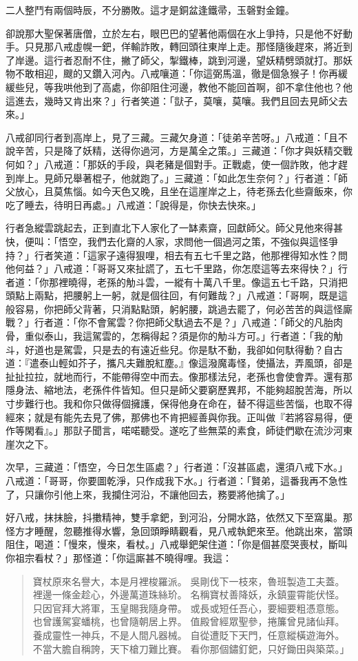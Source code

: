 二人整鬥有兩個時辰，不分勝敗。這才是銅盆逢鐵帚，玉磬對金鐘。

卻說那大聖保著唐僧，立於左右，眼巴巴的望著他兩個在水上爭持，只是他不好動手。只見那八戒虛幌一鈀，佯輸詐敗，轉回頭往東岸上走。那怪隨後趕來，將近到了岸邊。這行者忍耐不住，撇了師父，掣鐵棒，跳到河邊，望妖精劈頭就打。那妖物不敢相迎，颼的又鑽入河內。八戒嚷道：「你這弼馬溫，徹是個急猴子！你再緩緩些兒，等我哄他到了高處，你卻阻住河邊，教他不能回首啊，卻不拿住他也？他這進去，幾時又肯出來？」行者笑道：「獃子，莫嚷，莫嚷。我們且回去見師父去來。」

八戒卻同行者到高岸上，見了三藏。三藏欠身道：「徒弟辛苦呀。」八戒道：「且不說辛苦，只是降了妖精，送得你過河，方是萬全之策。」三藏道：「你才與妖精交戰何如？」八戒道：「那妖的手段，與老豬是個對手。正戰處，使一個詐敗，他才趕到岸上。見師兄舉著棍子，他就跑了。」三藏道：「如此怎生奈何？」行者道：「師父放心，且莫焦惱。如今天色又晚，且坐在這崖岸之上，待老孫去化些齋飯來，你吃了睡去，待明日再處。」八戒道：「說得是，你快去快來。」

行者急縱雲跳起去，正到直北下人家化了一缽素齋，回獻師父。師父見他來得甚快，便叫：「悟空，我們去化齋的人家，求問他一個過河之策，不強似與這怪爭持？」行者笑道：「這家子遠得狠哩，相去有五七千里之路，他那裡得知水性？問他何益？」八戒道：「哥哥又來扯謊了，五七千里路，你怎麼這等去來得快？」行者道：「你那裡曉得，老孫的觔斗雲，一縱有十萬八千里。像這五七千路，只消把頭點上兩點，把腰躬上一躬，就是個往回，有何難哉？」八戒道：「哥啊，既是這般容易，你把師父背著，只消點點頭，躬躬腰，跳過去罷了，何必苦苦的與這怪廝戰？」行者道：「你不會駕雲？你把師父馱過去不是？」八戒道：「師父的凡胎肉骨，重似泰山，我這駕雲的，怎稱得起？須是你的觔斗方可。」行者道：「我的觔斗，好道也是駕雲，只是去的有遠近些兒。你是馱不動，我卻如何馱得動？自古道：『遣泰山輕如芥子，攜凡夫難脫紅塵。』像這潑魔毒怪，使攝法，弄風頭，卻是扯扯拉拉，就地而行，不能帶得空中而去。像那樣法兒，老孫也會使會弄。還有那隱身法、縮地法，老孫件件皆知。但只是師父要窮歷異邦，不能夠超脫苦海，所以寸步難行也。我和你只做得個擁護，保得他身在命在，替不得這些苦惱，也取不得經來；就是有能先去見了佛，那佛也不肯把經善與你我。正叫做『若將容易得，便作等閑看』。」那獃子聞言，喏喏聽受。遂吃了些無菜的素食，師徒們歇在流沙河東崖次之下。

次早，三藏道：「悟空，今日怎生區處？」行者道：「沒甚區處，還須八戒下水。」八戒道：「哥哥，你要圖乾淨，只作成我下水。」行者道：「賢弟，這番我再不急性了，只讓你引他上來，我攔住河沿，不讓他回去，務要將他擒了。」

好八戒，抹抹臉，抖擻精神，雙手拿鈀，到河沿，分開水路，依然又下至窩巢。那怪方才睡醒，忽聽推得水響，急回頭睜睛觀看，見八戒執鈀來至。他跳出來，當頭阻住，喝道：「慢來，慢來，看杖。」八戒舉鈀架住道：「你是個甚麼哭喪杖，斷叫你祖宗看杖？」那怪道：「你這廝甚不曉得哩。我這：
\begin{quote}
寶杖原來名譽大，本是月裡梭羅派。
吳剛伐下一枝來，魯班製造工夫蓋。
裡邊一條金趁心，外邊萬道珠絲玠。
名稱寶杖善降妖，永鎮靈霄能伏怪。
只因官拜大將軍，玉皇賜我隨身帶。
或長或短任吾心，要細要粗憑意態。
也曾護駕宴蟠桃，也曾隨朝居上界。
值殿曾經眾聖參，捲簾曾見諸仙拜。
養成靈性一神兵，不是人間凡器械。
自從遭貶下天門，任意縱橫遊海外。
不當大膽自稱誇，天下槍刀難比賽。
看你那個鏽釘鈀，只好鋤田與築菜。」
\end{quote}

